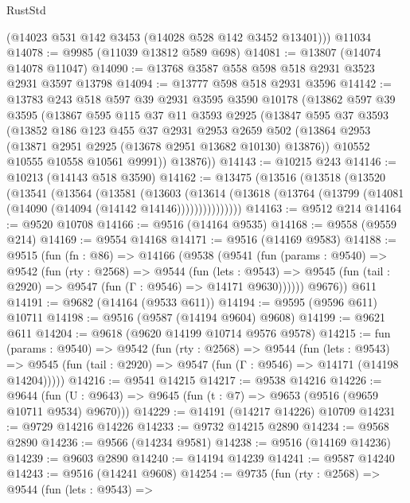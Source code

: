 \begin{lexlean}{RustStd}
\begin{coremodule}
      (@14023 @531 @142 @3453 (@14028 @528 @142 @3452 @13401)))
    @11034
@14078 := @9985 (@11039 @13812 @589 @698)
@14081 := @13807 (@14074 @14078 @11047)
@14090 := @13768 @3587 @558 @598 @518 @2931 @3523 @2931 @3597 @13798
@14094 := @13777 @598 @518 @2931 @3596
@14142 := @13783
    @243
    @518
    @597
    @39
    @2931
    @3595
    @3590
    @10178
    (@13862
      @597
      @39
      @3595
      (@13867
        @595
        @115
        @37
        @11
        @3593
        @2925
        (@13847
          @595
          @37
          @3593
          (@13852
            @186
            @123
            @455
            @37
            @2931
            @2953
            @2659
            @502
            (@13864 @2953 (@13871 @2951 @2925 (@13678 @2951 @13682 @10130) @13876))
            @10552
            @10555
            @10558
            @10561
            @9991))
        @13876))
@14143 := @10215 @243
@14146 := @10213 (@14143 @518 @3590)
@14162 := @13475
    (@13516
      (@13518
        (@13520
          (@13541
            (@13564
              (@13581
                (@13603
                  (@13614
                    (@13618 (@13764 (@13799 (@14081 (@14090 (@14094 (@14142 @14146)))))))))))))))
@14163 := @9512 @214
@14164 := @9520 @10708
@14166 := @9516 (@14164 @9535)
@14168 := @9558 (@9559 @214)
@14169 := @9554 @14168
@14171 := @9516 (@14169 @9583)
@14188 := @9515
    (fun (fn : @86) =>
    @14166
      (@9538
        (@9541
          (fun (params : @9540) =>
          @9542
            (fun (rty : @2568) =>
            @9544
              (fun (lets : @9543) =>
              @9545 (fun (tail : @2920) => @9547 (fun (Γ : @9546) => @14171 @9630))))))
        @9676))
    @611
@14191 := @9682 (@14164 (@9533 @611))
@14194 := @9595 (@9596 @611) @10711
@14198 := @9516 (@9587 (@14194 @9604) @9608)
@14199 := @9621 @611
@14204 := @9618 (@9620 @14199 @10714 @9576 @9578)
@14215 := fun (params : @9540) =>
  @9542
    (fun (rty : @2568) =>
    @9544
      (fun (lets : @9543) =>
      @9545 (fun (tail : @2920) => @9547 (fun (Γ : @9546) => @14171 (@14198 @14204)))))
@14216 := @9541 @14215
@14217 := @9538 @14216
@14226 := @9644
    (fun (U : @9643) => @9645 (fun (t : @7) => @9653 (@9516 (@9659 @10711 @9534) @9670)))
@14229 := @14191 (@14217 @14226) @10709
@14231 := @9729 @14216 @14226
@14233 := @9732 @14215 @2890
@14234 := @9568 @2890
@14236 := @9566 (@14234 @9581)
@14238 := @9516 (@14169 @14236)
@14239 := @9603 @2890
@14240 := @14194 @14239
@14241 := @9587 @14240
@14243 := @9516 (@14241 @9608)
@14254 := @9735
    (fun (rty : @2568) =>
    @9544
      (fun (lets : @9543) =>

\end{coremodule}
\end{lexlean}
